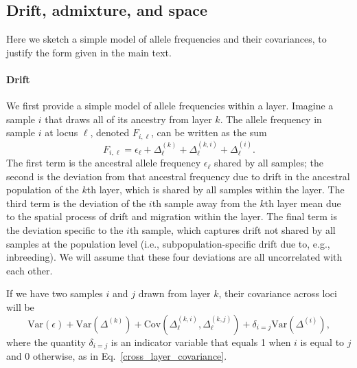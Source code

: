 \documentclass[10pt,letterpaper]{article}
\begin{document}
\subsection*{Drift, admixture, and space}
Here we sketch a simple model of allele frequencies and their
covariances, to justify the form given in the main text.

\paragraph{Drift} 
We first provide a simple model of allele frequencies within a layer. 
Imagine a sample $i$ that draws all of its ancestry from layer $k$.
The allele frequency in sample $i$ at locus $\ell$, denoted $F_{i,\ell}$, can be
written as the sum
\begin{equation}
F_{i,\ell} = \epsilon_{\ell} + \Delta^{(k)}_{\ell} +
\Delta^{(k,i)}_{\ell} + \Delta^{(i)}_{\ell} .
\label{drift_terms_no_admix}
\end{equation}
The first term is the ancestral allele frequency $\epsilon_\ell$ shared by all samples; 
the second is the deviation from that ancestral frequency 
due to drift in the ancestral population of the $k$th layer,
which is shared by all samples within the layer. 
The third term is the deviation of the $i$th sample away from the $k$th layer mean 
due to the spatial process of drift and migration within the layer.
The final term is the deviation specific to the $i$th sample,
which captures drift not shared by all samples at the population level
(i.e., subpopulation-specific drift due to, e.g., inbreeding). 
We will assume that these four deviations are all uncorrelated with each other.

If we have two samples $i$ and $j$ drawn from layer $k$, 
their covariance across loci will be 
\begin{equation}
\text{Var}(\epsilon) +  \text{Var}\left( \Delta^{(k)} \right) +
\text{Cov}(\Delta^{(k,i)}_{\ell},\Delta^{(k,j)}_{\ell}) + \delta_{i=j} \text{Var}\left( \Delta^{(i)} \right),
\end{equation}
where the quantity $\delta_{i=j}$ is an indicator variable that equals 1 when $i$ is equal to $j$ and 0 otherwise, 
as in Eq.\ \eqref{cross_layer_covariance}.
\end{document}
